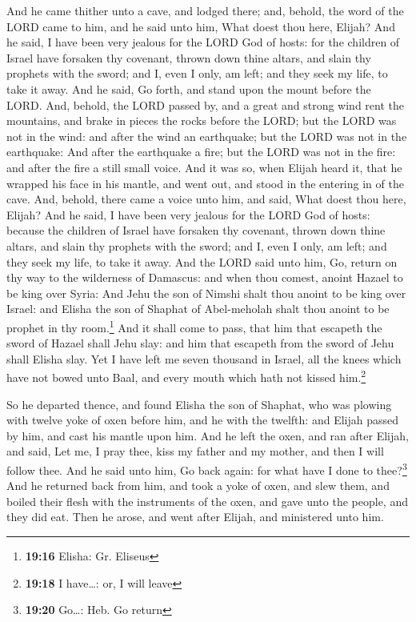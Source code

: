 And he came thither unto a cave, and lodged there; and,
behold, the word of the LORD came to him, and he said unto him, What
doest thou here, Elijah?  And he said, I have been very
jealous for the LORD God of hosts: for the children of Israel have
forsaken thy covenant, thrown down thine altars, and slain thy prophets
with the sword; and I, even I only, am left; and they seek my life, to
take it away.  And he said, Go forth, and stand upon the
mount before the LORD. And, behold, the LORD passed by, and a great and
strong wind rent the mountains, and brake in pieces the rocks before the
LORD; but the LORD was not in the wind: and after the wind an
earthquake; but the LORD was not in the earthquake:  And
after the earthquake a fire; but the LORD was not in the fire: and after
the fire a still small voice.  And it was so, when Elijah
heard it, that he wrapped his face in his mantle, and went out, and
stood in the entering in of the cave. And, behold, there came a voice
unto him, and said, What doest thou here, Elijah?  And he
said, I have been very jealous for the LORD God of hosts: because the
children of Israel have forsaken thy covenant, thrown down thine altars,
and slain thy prophets with the sword; and I, even I only, am left; and
they seek my life, to take it away.  And the LORD said
unto him, Go, return on thy way to the wilderness of Damascus: and when
thou comest, anoint Hazael to be king over Syria:  And
Jehu the son of Nimshi shalt thou anoint to be king over Israel: and
Elisha the son of Shaphat of Abel-meholah shalt thou anoint to be
prophet in thy room.\footnote{\textbf{19:16} Elisha: Gr. Eliseus}
 And it shall come to pass, that him that escapeth the
sword of Hazael shall Jehu slay: and him that escapeth from the sword of
Jehu shall Elisha slay.  Yet I have left me seven
thousand in Israel, all the knees which have not bowed unto Baal, and
every mouth which hath not kissed him.\footnote{\textbf{19:18} I
  have\ldots: or, I will leave}

 So he departed thence, and found Elisha the son of
Shaphat, who was plowing with twelve yoke of oxen before him, and he
with the twelfth: and Elijah passed by him, and cast his mantle upon
him.  And he left the oxen, and ran after Elijah, and
said, Let me, I pray thee, kiss my father and my mother, and then I will
follow thee. And he said unto him, Go back again: for what have I done
to thee?\footnote{\textbf{19:20} Go\ldots: Heb. Go return}
 And he returned back from him, and took a yoke of oxen,
and slew them, and boiled their flesh with the instruments of the oxen,
and gave unto the people, and they did eat. Then he arose, and went
after Elijah, and ministered unto him.

